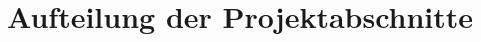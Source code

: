 \documentclass[./dokumentation.tex]{subfiles}
\begin{document}
\section*{Aufteilung der Projektabschnitte}
\end{document}
